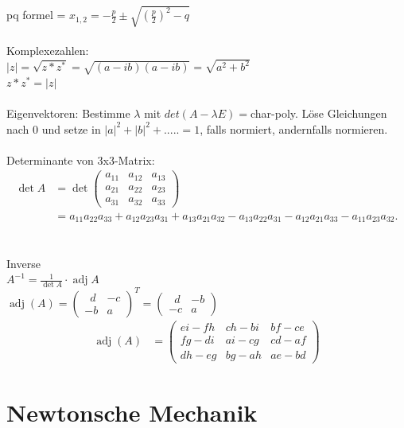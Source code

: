 \documentclass[10pt,a4paper]{article}
\begin{document}
%
pq formel = $x_{1,2} = - \frac{p}{2}\pm\sqrt{\left(\frac{p}2\right)^2 - q}$\\
%
\\
Komplexezahlen:\\
$|z|=\sqrt{z*z^*}=\sqrt{(a-ib)(a-ib)}=\sqrt{a^2+b^2}$\\
$z*z^*=|z|$\\
%
\\
Eigenvektoren: Bestimme $\lambda$ mit $det(A-\lambda E)=$char-poly. Löse Gleichungen nach 0 und setze in $|a|^2+|b|^2+..... = 1$, falls normiert, andernfalls normieren.\\
%
\\
Determinante von 3x3-Matrix:\\
\begin{align}\det A &= \det \begin{pmatrix} a_{11} & a_{12} & a_{13} \\ a_{21} & a_{22} & a_{23} \\ a_{31} & a_{32} & a_{33} \end{pmatrix}\\ &= a_{11} a_{22} a_{33} +a_{12} a_{23} a_{31} + a_{13} a_{21} a_{32} - a_{13} a_{22} a_{31} - a_{12} a_{21} a_{33} - a_{11} a_{23} a_{32}.\end{align}\\
%
\\
Inverse\\
$A^{-1} = \frac{1}{\det A} \cdot \operatorname{adj} A$\\
$\operatorname{adj} (A) = \begin{pmatrix} \,\,\,{{d}} & \!\!{{-c}}\\ {{-b}} & {{a}} \end{pmatrix} ^T = \begin{pmatrix} \,\,\,{{d}} & \!\!{{-b}}\\ {{-c}} & {{a}} \end{pmatrix}$\\
\begin{align}\operatorname{adj} (A)& =\begin{pmatrix}ei - fh & ch - bi & bf - ce \\fg - di & ai - cg & cd - af \\dh - eg & bg - ah & ae - bd\end{pmatrix}\end{align}


\section{Newtonsche Mechanik}
\end{document}
